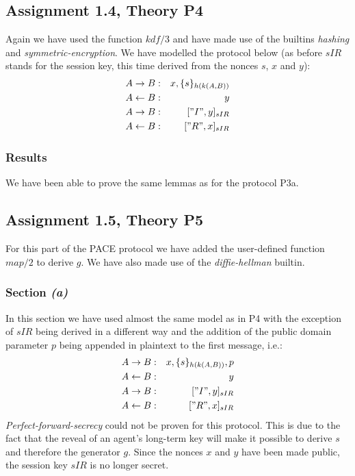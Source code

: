 \documentclass[a4paper]{article}
\begin{document}
\subsection{Assignment 1.4, Theory P4}
Again we have used the function $kdf/3$ and have made use of the builtins {\em hashing} and {\em symmetric-encryption}. We have modelled the protocol below (as before $sIR$ stands for the session key, this time derived from the nonces $s$, $x$ and $y$):
\begin{eqnarray*}
A \to B        & : & x, \{s\}_{h(k(A,B))}\\
A \leftarrow B & : & y\\
A \to B        & : & ["I",y]_{sIR}\\
A \leftarrow B & : & ["R",x]_{sIR} 
\end{eqnarray*}

\subsubsection*{Results}
We have been able to prove the same lemmas as for the protocol P3a.

\subsection{Assignment 1.5, Theory P5}
For this part of the PACE protocol we have added the user-defined function $map/2$ to derive $g$. We have also made use of the {\em diffie-hellman} builtin.
\subsubsection{Section {\it\bf (a)}}
In this section we have used almost the same model as in P4 with the exception of $sIR$ being derived in a different way and the addition of the public domain parameter $p$ being appended in plaintext to the first message, i.e.:
\begin{eqnarray*}
A \to B        & : & x, \{s\}_{h(k(A,B))}, p\\
A \leftarrow B & : & y\\
A \to B        & : & ["I",y]_{sIR}\\
A \leftarrow B & : & ["R",x]_{sIR} 
\end{eqnarray*}
{\em Perfect-forward-secrecy} could not be proven for this protocol. This is due to the fact that the reveal of an agent's long-term key will make it possible to derive $s$ and therefore the generator $g$. Since the nonces $x$ and $y$ have been made public, the session key $sIR$ is no longer secret.
\end{document}
